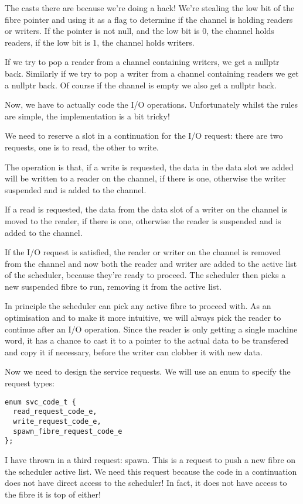 \documentclass[oneside]{book}
\begin{document}
The casts there are because we're doing a hack!
We're stealing the low bit of the fibre pointer and using
it as a flag to determine if the channel is holding readers
or writers. If the pointer is not null, and the low bit is
0, the channel holds readers, if the low bit is 1, the channel
holds writers.

If we try to pop a reader from a channel containing writers, we get 
a nullptr back. Similarly if we try to pop a writer from a channel
containing readers we get a nullptr back. Of course if the channel
is empty we also get a nullptr back.

Now, we have to actually code the I/O operations. Unfortunately
whilst the rules are simple, the implementation is a bit tricky!

We need to reserve a slot in a continuation for the I/O request:
there are two requests, one is to read, the other to write.

The operation is that, if a write is requested, the data in the data slot
we added will be written to a reader on the channel, if there is one,
otherwise the writer suspended and is added to the channel. 

If a read is requested, the data from the data slot of a writer on
the channel is moved to the reader, if there is one, otherwise
the reader is suspended and is added to the channel.

If the I/O request is satisfied, the reader or writer on the channel
is removed from the channel and now both the reader and writer are
added to the active list of the scheduler, because they're ready to
proceed. The scheduler then picks a new suspended fibre to run,
removing it from the active list.

In principle the scheduler can pick any active fibre to proceed with.
As an optimisation and to make it more intuitive, we will always
pick the reader to continue after an I/O operation. Since the reader
is only getting a single machine word, it has a chance to cast it to
a pointer to the actual data to be transfered and copy it if necessary,
before the writer can clobber it with new data.

Now we need to design the service requests. We will use an enum
to specify the request types:

\begin{verbatim}
enum svc_code_t {
  read_request_code_e,
  write_request_code_e,
  spawn_fibre_request_code_e
};
\end{verbatim}

I have thrown in a third request: spawn. This is a request to push a new
fibre on the scheduler active list. We need this request because the code
in a continuation does not have direct access to the scheduler! In fact,
it does not have access to the fibre it is top of either!
\end{document}
